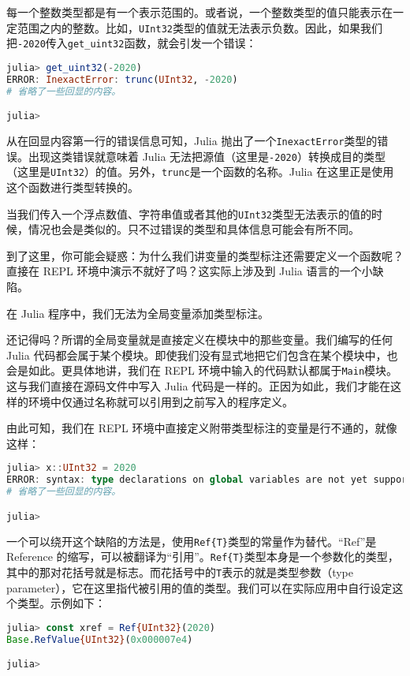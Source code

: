 每一个整数类型都是有一个表示范围的。或者说，一个整数类型的值只能表示在一定范围之内的整数。比如，\verb|UInt32|类型的值就无法表示负数。因此，如果我们把\verb|-2020|传入\verb|get_uint32|函数，就会引发一个错误：

\begin{lstlisting}[language=julia]
julia> get_uint32(-2020)
ERROR: InexactError: trunc(UInt32, -2020)
# 省略了一些回显的内容。

julia>  
\end{lstlisting}

从在回显内容第一行的错误信息可知，Julia 抛出了一个\verb|InexactError|类型的错误。出现这类错误就意味着 Julia 无法把源值（这里是\verb|-2020|）转换成目的类型（这里是\verb|UInt32|）的值。另外，\verb|trunc|是一个函数的名称。Julia 在这里正是使用这个函数进行类型转换的。

当我们传入一个浮点数值、字符串值或者其他的\verb|UInt32|类型无法表示的值的时候，情况也会是类似的。只不过错误的类型和具体信息可能会有所不同。

到了这里，你可能会疑惑：为什么我们讲变量的类型标注还需要定义一个函数呢？直接在 REPL 环境中演示不就好了吗？这实际上涉及到 Julia 语言的一个小缺陷。

在 Julia 程序中，我们无法为全局变量添加类型标注。

还记得吗？所谓的全局变量就是直接定义在模块中的那些变量。我们编写的任何 Julia 代码都会属于某个模块。即使我们没有显式地把它们包含在某个模块中，也会是如此。更具体地讲，我们在 REPL 环境中输入的代码默认都属于\verb|Main|模块。这与我们直接在源码文件中写入 Julia 代码是一样的。正因为如此，我们才能在这样的环境中仅通过名称就可以引用到之前写入的程序定义。

由此可知，我们在 REPL 环境中直接定义附带类型标注的变量是行不通的，就像这样：

\begin{lstlisting}[language=julia]
julia> x::UInt32 = 2020
ERROR: syntax: type declarations on global variables are not yet supported
# 省略了一些回显的内容。

julia> 
\end{lstlisting}

一个可以绕开这个缺陷的方法是，使用\verb|Ref{T}|类型的常量作为替代。“Ref”是 Reference 的缩写，可以被翻译为“引用”。\verb|Ref{T}|类型本身是一个参数化的类型，其中的那对花括号就是标志。而花括号中的\verb|T|表示的就是类型参数（type parameter），它在这里指代被引用的值的类型。我们可以在实际应用中自行设定这个类型。示例如下：

\begin{lstlisting}[language=julia]
julia> const xref = Ref{UInt32}(2020)
Base.RefValue{UInt32}(0x000007e4)

julia> 
\end{lstlisting}


